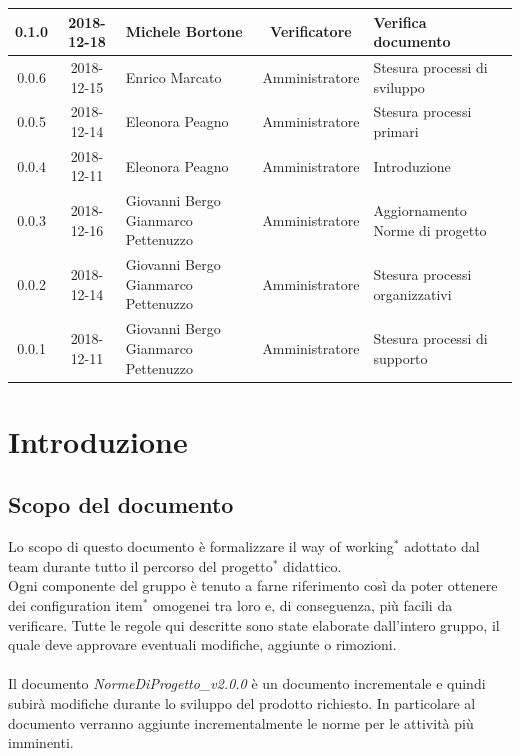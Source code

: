 \documentclass[11pt,a4paper]{article}
\begin{document}
{\begin{tabularx}{\textwidth}{ c | c | p{3.80cm} | c | X }
		0.1.0 & 2018-12-18 & Michele Bortone & Verificatore & Verifica documento \\ \hline
		0.0.6 & 2018-12-15 & Enrico Marcato & Amministratore & Stesura processi di \newline sviluppo \\ \hline
		0.0.5 & 2018-12-14 & Eleonora Peagno & Amministratore & Stesura processi primari \\ \hline
		0.0.4 & 2018-12-11 & Eleonora Peagno & Amministratore & Introduzione \\ \hline
		0.0.3 & 2018-12-16 & Giovanni Bergo \newline Gianmarco Pettenuzzo & Amministratore & Aggiornamento Norme di progetto \\ \hline
		0.0.2 & 2018-12-14 & Giovanni Bergo \newline Gianmarco Pettenuzzo & Amministratore & Stesura processi \newline organizzativi \\ \hline
		0.0.1 & 2018-12-11 & Giovanni Bergo \newline Gianmarco Pettenuzzo & Amministratore & Stesura processi di \newline supporto \\ \hline		
	\end{tabularx}
	
	\newpage	
	
	\renewcommand  \contentsname {\Large Indice} 
	
	\tableofcontents
	\newpage
	\listoffigures
	\lstlistoflistings
	\newpage
	
	\section{Introduzione}
	\subsection{Scopo del documento}
	Lo scopo di questo documento è formalizzare il way of working$^*$ adottato dal team durante tutto il percorso del progetto$^*$ didattico. 
	\\Ogni componente del gruppo è tenuto a farne riferimento così da poter ottenere dei configuration item$^*$ omogenei tra loro e, di conseguenza, più facili da verificare. 
	Tutte le regole qui descritte sono state elaborate dall'intero gruppo, il quale deve approvare eventuali modifiche, aggiunte o rimozioni.
	\\\\
	Il documento \textit{NormeDiProgetto\_v2.0.0} è un documento incrementale e quindi subirà modifiche durante lo sviluppo del prodotto richiesto. In particolare al documento verranno aggiunte incrementalmente le norme per le attività più imminenti.
}
\end{document}
